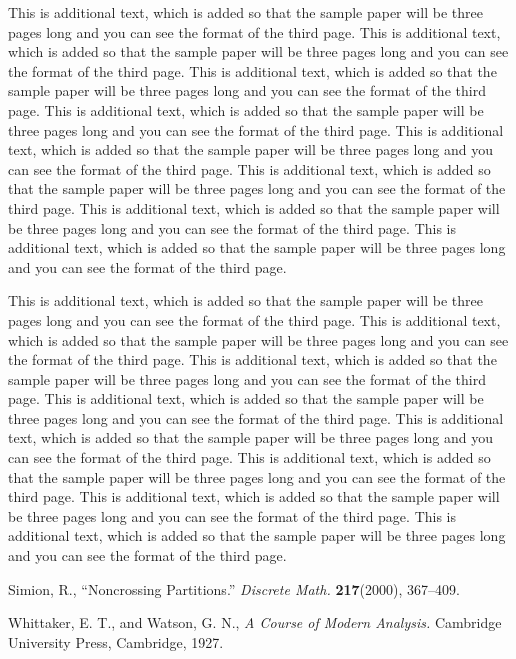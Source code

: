 \documentclass{amsart} %
\begin{document}
This is additional text, which is added so that the sample paper will be
three pages long and you can see the format of the third page.
This is additional text, which is added so that the sample paper will be
three pages long and you can see the format of the third page.
This is additional text, which is added so that the sample paper will be
three pages long and you can see the format of the third page.
This is additional text, which is added so that the sample paper will be
three pages long and you can see the format of the third page.
This is additional text, which is added so that the sample paper will be
three pages long and you can see the format of the third page.
This is additional text, which is added so that the sample paper will be
three pages long and you can see the format of the third page.
This is additional text, which is added so that the sample paper will be
three pages long and you can see the format of the third page.
This is additional text, which is added so that the sample paper will be
three pages long and you can see the format of the third page.

This is additional text, which is added so that the sample paper will be
three pages long and you can see the format of the third page.
This is additional text, which is added so that the sample paper will be
three pages long and you can see the format of the third page.
This is additional text, which is added so that the sample paper will be
three pages long and you can see the format of the third page.
This is additional text, which is added so that the sample paper will be
three pages long and you can see the format of the third page.
This is additional text, which is added so that the sample paper will be
three pages long and you can see the format of the third page.
This is additional text, which is added so that the sample paper will be
three pages long and you can see the format of the third page.
This is additional text, which is added so that the sample paper will be
three pages long and you can see the format of the third page.
This is additional text, which is added so that the sample paper will be
three pages long and you can see the format of the third page.

\begin{thebibliography}{9}

 Simion, R., ``Noncrossing Partitions.'' {\em Discrete Math.}
{\bf 217}(2000), 367--409.

 Whittaker, E. T.,  and Watson, G. N., {\em A Course of Modern
Analysis.} Cambridge University Press, Cambridge, 1927. 

\end{thebibliography}
\end{document}
